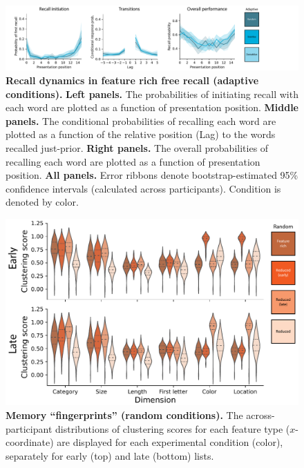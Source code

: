 \documentclass{article}
\begin{document}
\begin{figure}[p] \centering
    \includegraphics[width=\textwidth]{figures/recall_dynamics_adaptive}
    
    \caption{\textbf{Recall dynamics in feature rich free recall (adaptive conditions).} \textbf{Left panels.} The probabilities of
    initiating recall with each word are plotted as a function of presentation
    position. \textbf{Middle panels.} The conditional probabilities of recalling
    each word are plotted as a function of the relative position (Lag) to the words
    recalled just-prior. \textbf{Right panels.} The overall probabilities of
    recalling each word are plotted as a function of presentation position.
    \textbf{All panels.} Error ribbons denote bootstrap-estimated 95\% confidence
    intervals (calculated across participants). Condition is denoted by color.}
    
        \label{fig:recall-dynamics-adaptive}
    \end{figure}

\begin{figure}[tp] \centering
    \includegraphics[width=\textwidth]{figures/fingerprints_random}
    
    \caption{\textbf{Memory ``fingerprints'' (random conditions).}
    The across-participant distributions of clustering scores for each feature
    type ($x$-coordinate) are displayed for each experimental condition
    (color), separately for early (top) and late (bottom) lists.}
        \label{fig:fingerprints-random}
\end{figure}
    
\end{document}
